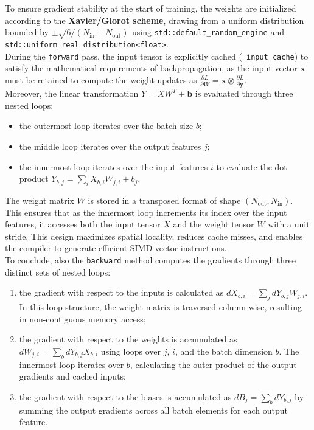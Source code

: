 To ensure gradient stability at the start of training, the weights are initialized according to the \textbf{Xavier/Glorot scheme}, drawing from a uniform distribution bounded by $\pm\sqrt{6 / (N_{\text{in}} + N_{\text{out}})}$ using \texttt{std::default\_random\_engine} and \texttt{std::uniform\_real\_distribution<float>}.\\

During the \texttt{forward} pass, the input tensor is explicitly cached (\texttt{\_input\_cache}) to satisfy the mathematical requirements of backpropagation, as the input vector $\mathbf{x}$ must be retained to compute the weight updates as $\frac{\partial L}{\partial W} = \mathbf{x} \otimes \frac{\partial L}{\partial \mathbf{y}}$.\\

Moreover, the linear transformation $Y = X W^T + \mathbf{b}$ is evaluated through three nested loops:
\begin{itemize}
    \item[-] the outermost loop iterates over the batch size $b$;
    \item[-] the middle loop iterates over the output features $j$;
    \item[-] the innermost loop iterates over the input features $i$ to evaluate the dot product $Y_{b,j} = \sum_i X_{b,i} W_{j,i} + b_j$.
\end{itemize}
The weight matrix $W$ is stored in a transposed format of shape $(N_{\text{out}}, N_{\text{in}})$. This ensures that as the innermost loop increments its index over the input features, it accesses both the input tensor $X$ and the weight tensor $W$ with a unit stride. This design maximizes spatial locality, reduces cache misses, and enables the compiler to generate efficient SIMD vector instructions.\\

To conclude, also the \texttt{backward} method computes the gradients through three distinct sets of nested loops:
\begin{enumerate}
    \item the gradient with respect to the inputs is calculated as $dX_{b,i} = \sum_j dY_{b,j} W_{j,i}$. In this loop structure, the weight matrix is traversed column-wise, resulting in non-contiguous memory access;
    \item the gradient with respect to the weights is accumulated as $dW_{j,i} = \sum_b dY_{b,j} X_{b,i}$ using loops over $j$, $i$, and the batch dimension $b$. The innermost loop iterates over $b$, calculating the outer product of the output gradients and cached inputs;
    \item the gradient with respect to the biases is accumulated as $dB_j = \sum_b dY_{b,j}$ by summing the output gradients across all batch elements for each output feature.
\end{enumerate}

